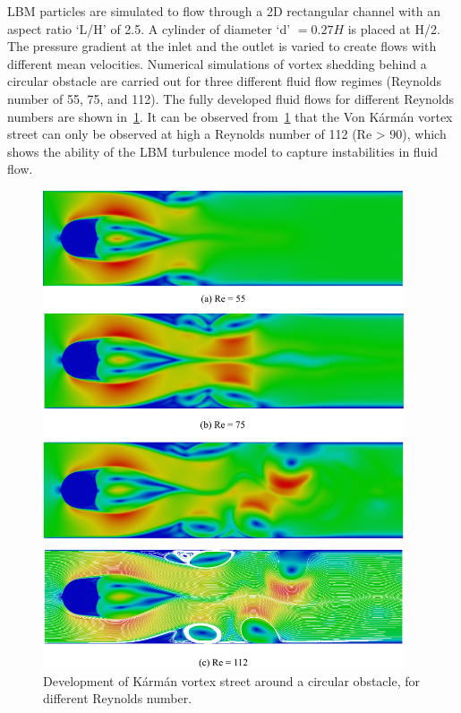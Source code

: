 LBM particles are simulated to flow through a 2D rectangular channel with an 
aspect ratio `L/H' of 2.5. A cylinder of diameter `d' $=0.27H$ is placed at 
H/2. The pressure gradient at the inlet and the outlet is varied to create 
flows with different mean velocities. Numerical simulations of vortex 
shedding behind a circular obstacle are carried out for three different fluid 
flow regimes (Reynolds number of 55, 75, and 112). The fully developed fluid 
flows for different Reynolds numbers are shown in~\cref{fig:karman}. It can be 
observed from~\cref{fig:karman} that the Von K\'{a}rm\'{a}n vortex street can 
only be observed at high a Reynolds number of 112 (Re > 90), which shows the 
ability of the LBM turbulence model to capture instabilities in fluid flow.
%
\begin{figure}[htbp]
	\centering
	\includegraphics[width=0.95\textwidth]{karman}
	\caption{Development of K\'{a}rm\'{a}n vortex street around a circular 
	obstacle, for different Reynolds number.}
	\label{fig:karman}
\end{figure}

